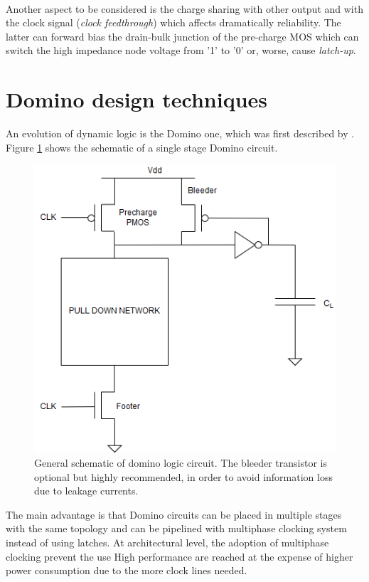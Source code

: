 \paragraph{} Another aspect to be considered is the charge sharing with other output and with the clock signal (\textit{clock feedthrough}) which affects dramatically reliability. The latter can forward bias the drain-bulk junction of the pre-charge MOS  which  can switch the high impedance node voltage from '1' to '0' or, worse, cause \textit{latch-up}.

\newpage
\section{Domino design techniques}
An evolution of dynamic logic is the Domino one, which was first described by \cite{Krambeck}. Figure \ref{fig:DOMINO} shows the schematic of a single stage Domino circuit.

\begin{figure}[H]
\centering
\includegraphics[width = 7 cm]{dinamic_logic_survey/Dynamic_logic-Page-2.png}
\caption{General schematic of domino logic circuit. The bleeder transistor is optional but highly recommended, in order to avoid information loss due to leakage currents.}
\label{fig:DOMINO}
\end{figure}

The main advantage is that Domino circuits can be placed in multiple stages with the same topology and can be pipelined with multiphase clocking system \cite{Verma} instead of using latches. At architectural level, the adoption of multiphase clocking prevent the use  High performance are reached at the expense of higher power consumption due to the more clock lines needed.


